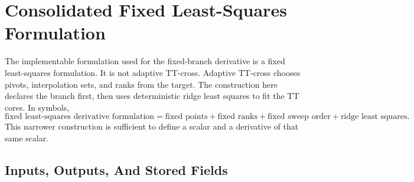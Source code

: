 \documentclass[11pt]{article}
\numberwithin{equation}{section}
\begin{document}
\section{Consolidated Fixed Least-Squares Formulation}

The implementable formulation used for the fixed-branch derivative is a fixed
least-squares formulation.  It is not adaptive TT-cross.  Adaptive TT-cross chooses
pivots, interpolation sets, and ranks from the target.  The construction here declares
the branch first, then uses deterministic ridge least squares to fit the TT
cores.  In symbols,
\begin{equation}
    \text{fixed least-squares derivative formulation}
    =
    \text{fixed points}
    +
    \text{fixed ranks}
    +
    \text{fixed sweep order}
    +
    \text{ridge least squares}.
    \label{eq:p25-ls-1}
\end{equation}
This narrower construction is sufficient to define a scalar and a derivative of that
same scalar.

\subsection{Inputs, Outputs, And Stored Fields}
\end{document}
